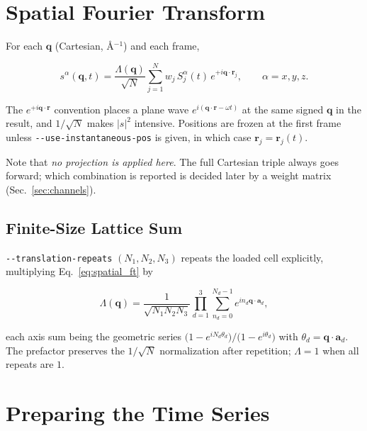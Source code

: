 \documentclass[12pt, a4paper, oneside]{article}
\newcommand{\qvec}{\mathbf{q}}
\newcommand{\rvec}{\mathbf{r}}
\newcommand{\avec}{\mathbf{a}}
\newcommand{\Na}{N}
\newcommand{\field}{S}
\begin{document}
\section{Spatial Fourier Transform}
\label{sec:spatial}

For each $\qvec$ (Cartesian, \AA$^{-1}$) and each frame,

\begin{equation}
\boxed{
    s^\alpha(\qvec,t) = \frac{\Lambda(\qvec)}{\sqrt{\Na}}
    \sum_{j=1}^{\Na} w_j\,\field_j^\alpha(t)\,e^{+i\qvec\cdot\rvec_j},
    \qquad \alpha = x,y,z.
}
\label{eq:spatial_ft}
\end{equation}

The $e^{+i\qvec\cdot\rvec}$ convention places a plane wave
$e^{i(\qvec\cdot\rvec-\omega t)}$ at the same signed $\qvec$ in the result, and
$1/\sqrt{\Na}$ makes $\lvert s\rvert^2$ intensive. Positions are frozen at the
first frame unless \texttt{-\/-use-instantaneous-pos} is given, in which case
$\rvec_j = \rvec_j(t)$.

Note that \emph{no projection is applied here}. The full Cartesian triple always
goes forward; which combination is reported is decided later by a weight matrix
(Sec.~\ref{sec:channels}).

\subsection{Finite-Size Lattice Sum}

\texttt{-\/-translation-repeats} $(N_1,N_2,N_3)$ repeats the loaded cell
explicitly, multiplying Eq.~\eqref{eq:spatial_ft} by

\begin{equation}
\boxed{
    \Lambda(\qvec) = \frac{1}{\sqrt{N_1N_2N_3}}
    \prod_{d=1}^{3}\sum_{n_d=0}^{N_d-1} e^{i n_d \qvec\cdot\avec_d},
}
\label{eq:lattice_sum}
\end{equation}

each axis sum being the geometric series $\bigl(1-e^{iN_d\theta_d}\bigr)/
\bigl(1-e^{i\theta_d}\bigr)$ with $\theta_d = \qvec\cdot\avec_d$. The prefactor
preserves the $1/\sqrt{\Na}$ normalization after repetition; $\Lambda = 1$ when
all repeats are $1$.

\section{Preparing the Time Series}
\end{document}
